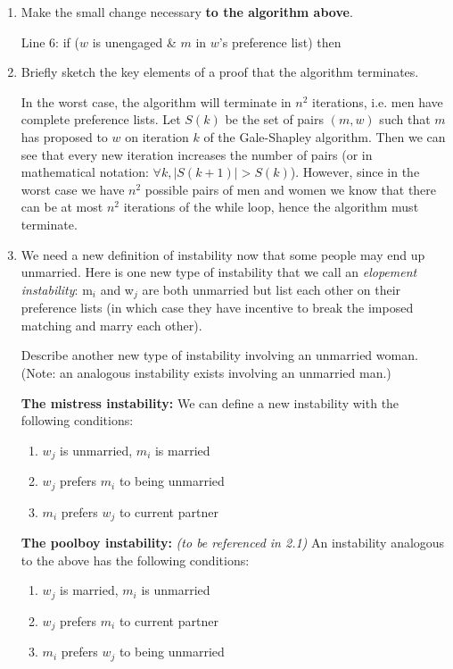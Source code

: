 \documentclass[11pt, oneside]{article}   	%
\theoremstyle{definition}
\theoremstyle{remark}
\begin{document}
\begin{enumerate}
	\item Make the small change necessary \textbf{to the algorithm above}.

	\qquad Line 6: if ($w$ is unengaged \& $m$ in $w$'s preference list) then

	\item Briefly sketch the key elements of a proof that the algorithm terminates.
	
	In the worst case, the algorithm will terminate in $n^2$ iterations, i.e. men have complete preference lists. Let $S(k)$ be the set of pairs $(m, w)$ such that $m$ has proposed to $w$ on iteration $k$ of the Gale-Shapley algorithm. Then we can see that every new iteration increases the number of pairs (or in mathematical notation: $\forall k, |S(k+1)| > S(k)$). However, since in the worst case we have $n^2$ possible pairs of men and women we know that there can be at most $n^2$ iterations of the while loop, hence the algorithm must terminate.
	
	
	\item We need a new definition of instability now that some people may
   end up unmarried. Here is one new type of instability that we call
   an \emph{elopement instability}: m$_i$ and w$_j$ are both unmarried but list
   each other on their preference lists (in which case they have
   incentive to break the imposed matching and marry each other).
   
   Describe another new type of instability involving an unmarried
   woman. (Note: an analogous instability exists involving an
   unmarried man.)
   
   \textbf{The mistress instability: } We can define a new instability with the following conditions:
   		\begin{enumerate}
   			\item $w_j$ is unmarried, $m_i$ is married
   			\item $w_j$ prefers $m_i$ to being unmarried 
   			\item $m_i$ prefers $w_j$ to current partner
   
   \end{enumerate}
   \textbf{The poolboy instability: }\textit{(to be referenced in 2.1)} An instability analogous to the above has the following conditions: 
   \begin{enumerate}
   			\item $w_j$ is married, $m_i$ is unmarried
   			\item $w_j$ prefers $m_i$ to current partner
   			\item $m_i$ prefers $w_j$ to being unmarried
   

\end{enumerate}
\end{enumerate}
\end{document}
